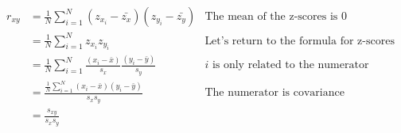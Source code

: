 \begin{align*}
	r_{xy} & =  \frac{1}{N}\sum_{i=1}^N (z_{x_i} - \bar{z_x})(z_{y_i} - \bar{z_y})            & \mbox{The mean of the z-scores is 0}            \\
	       & = \frac{1}{N}\sum_{i=1}^N z_{x_i} z_{y_i}                                        & \mbox{Let's return to the formula for z-scores} \\
	       & = \frac{1}{N}\sum_{i=1}^N \frac{(x_i - \bar{x})}{s_x} \frac{(y_i -\bar{y})}{s_y} & \mbox{$i$ is only related to the numerator}     \\
	       & = \frac{\frac{1}{N}\sum_{i=1}^N (x_i - \bar{x})(y_i -\bar{y})}{s_xs_y}           & \mbox{The numerator is covariance}              \\
	       & = \frac{s_{xy}}{s_xs_y}                                                          &                                                 \\
\end{align*}

